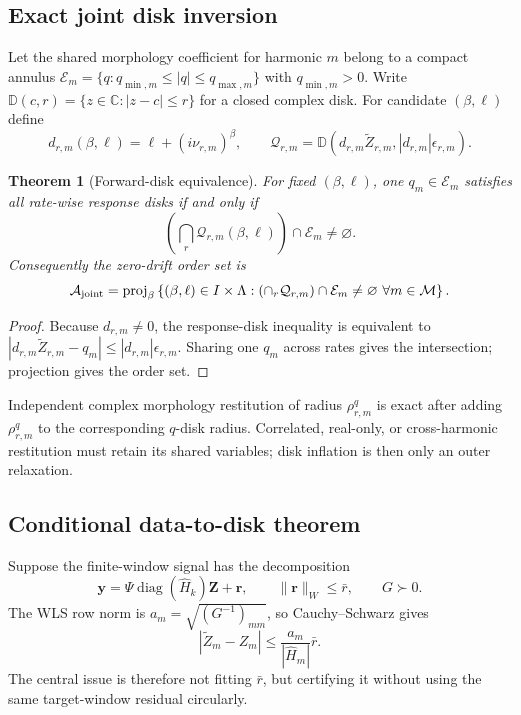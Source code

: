 \documentclass[11pt]{article}
\newtheorem{theorem}{Theorem}[section]
\theoremstyle{definition}
\theoremstyle{remark}
\newcommand{\C}{\mathbb C}
\newcommand{\Aset}{\mathcal A}
\newcommand{\Disc}{\mathbb D}
\newcommand{\Mtar}{\mathcal M}
\begin{document}
\subsection{Exact joint disk inversion}

Let the shared morphology coefficient for harmonic $m$ belong to a compact
annulus
$\mathcal E_m=\{q:q_{\min,m}\le|q|\le q_{\max,m}\}$ with $q_{\min,m}>0$.
Write $\Disc(c,r)=\{z\in\C:|z-c|\le r\}$ for a closed complex disk.
For candidate $(\beta,\ell)$ define
\[
 d_{r,m}(\beta,\ell)=\ell+(i\nu_{r,m})^\beta,\qquad
 \mathcal Q_{r,m}=\Disc(d_{r,m}\widetilde Z_{r,m},
 |d_{r,m}|\epsilon_{r,m}).
\]

\begin{theorem}[Forward-disk equivalence]
\label{thm:disk-main}
For fixed $(\beta,\ell)$, one $q_m\in\mathcal E_m$ satisfies all rate-wise
response disks if and only if
\[
 \left(\bigcap_r\mathcal Q_{r,m}(\beta,\ell)\right)
 \cap\mathcal E_m\ne\varnothing .
\]
Consequently the zero-drift order set is
\begin{equation}
 \Aset_{\rm joint}=\operatorname{proj}_\beta
 \left\{(\beta,\ell)\in I\times\Lambda:
 (\cap_r\mathcal Q_{r,m})\cap\mathcal E_m\ne\varnothing
 \ \forall m\in\Mtar\right\}.
 \label{eq:joint-main}
\end{equation}
\end{theorem}

\begin{proof}
Because $d_{r,m}\ne0$, the response-disk inequality is equivalent to
$|d_{r,m}\widetilde Z_{r,m}-q_m|\le|d_{r,m}|\epsilon_{r,m}$.
Sharing one $q_m$ across rates gives the intersection; projection gives the
order set.
\end{proof}

Independent complex morphology restitution of radius $\rho^q_{r,m}$ is exact
after adding $\rho^q_{r,m}$ to the corresponding $q$-disk radius.  Correlated,
real-only, or cross-harmonic restitution must retain its shared variables;
disk inflation is then only an outer relaxation.

\subsection{Conditional data-to-disk theorem}

Suppose the finite-window signal has the decomposition
\[
 \boldsymbol y=\Psi\operatorname{diag}(\widehat H_k)
 \boldsymbol Z+\boldsymbol r,\qquad
 \|\boldsymbol r\|_W\le\bar r,\qquad G\succ0.
\]
The WLS row norm is $a_m=\sqrt{(G^{-1})_{mm}}$, so Cauchy--Schwarz gives
\begin{equation}
 |\widetilde Z_m-Z_m|
 \le \frac{a_m}{|\widehat H_m|}\bar r .
 \label{eq:wls-bound-main}
\end{equation}
The central issue is therefore not fitting $\bar r$, but certifying it without
using the same target-window residual circularly.
\end{document}
